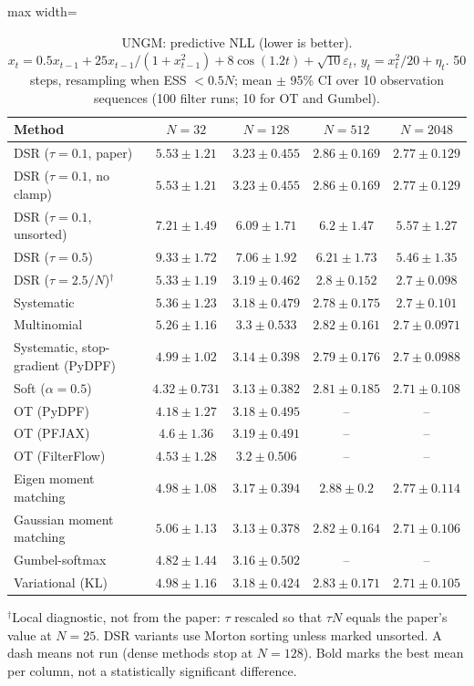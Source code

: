 \begin{table}[H]
\centering
\small
\caption{UNGM: predictive NLL (lower is better). $x_t=0.5x_{t-1}+25x_{t-1}/(1+x_{t-1}^2)+8\cos(1.2t)+\sqrt{10}\varepsilon_t$, $y_t=x_t^2/20+\eta_t$. 50 steps, resampling when ESS $<0.5N$; mean $\pm$ 95\% CI over 10 observation sequences (100 filter runs; 10 for OT and Gumbel).}
\label{tab:ungm-predictive_nll}
\begin{adjustbox}{max width=\linewidth}
\begin{tabular}{lcccc}
\toprule
Method & $N{=}32$ & $N{=}128$ & $N{=}512$ & $N{=}2048$ \\
\midrule
DSR ($\tau{=}0.1$, paper) & $5.53\pm1.21$ & $3.23\pm0.455$ & $2.86\pm0.169$ & $2.77\pm0.129$ \\
DSR ($\tau{=}0.1$, no clamp) & $5.53\pm1.21$ & $3.23\pm0.455$ & $2.86\pm0.169$ & $2.77\pm0.129$ \\
DSR ($\tau{=}0.1$, unsorted) & $7.21\pm1.49$ & $6.09\pm1.71$ & $6.2\pm1.47$ & $5.57\pm1.27$ \\
DSR ($\tau{=}0.5$) & $9.33\pm1.72$ & $7.06\pm1.92$ & $6.21\pm1.73$ & $5.46\pm1.35$ \\
DSR ($\tau{=}2.5/N$)$^\dagger$ & $5.33\pm1.19$ & $3.19\pm0.462$ & $2.8\pm0.152$ & $\mathbf{2.7\pm0.098}$ \\
\midrule
Systematic & $5.36\pm1.23$ & $3.18\pm0.479$ & $\mathbf{2.78\pm0.175}$ & $2.7\pm0.101$ \\
Multinomial & $5.26\pm1.16$ & $3.3\pm0.533$ & $2.82\pm0.161$ & $2.7\pm0.0971$ \\
Systematic, stop-gradient (PyDPF) & $4.99\pm1.02$ & $3.14\pm0.398$ & $2.79\pm0.176$ & $2.7\pm0.0988$ \\
Soft ($\alpha{=}0.5$) & $4.32\pm0.731$ & $3.13\pm0.382$ & $2.81\pm0.185$ & $2.71\pm0.108$ \\
OT (PyDPF) & $\mathbf{4.18\pm1.27}$ & $3.18\pm0.495$ & -- & -- \\
OT (PFJAX) & $4.6\pm1.36$ & $3.19\pm0.491$ & -- & -- \\
OT (FilterFlow) & $4.53\pm1.28$ & $3.2\pm0.506$ & -- & -- \\
Eigen moment matching & $4.98\pm1.08$ & $3.17\pm0.394$ & $2.88\pm0.2$ & $2.77\pm0.114$ \\
Gaussian moment matching & $5.06\pm1.13$ & $\mathbf{3.13\pm0.378}$ & $2.82\pm0.164$ & $2.71\pm0.106$ \\
Gumbel-softmax & $4.82\pm1.44$ & $3.16\pm0.502$ & -- & -- \\
Variational (KL) & $4.98\pm1.16$ & $3.18\pm0.424$ & $2.83\pm0.171$ & $2.71\pm0.105$ \\
\bottomrule
\end{tabular}
\end{adjustbox}
\par\smallskip\parbox{0.95\linewidth}{\footnotesize $^\dagger$Local diagnostic, not from the paper: $\tau$ rescaled so that $\tau N$ equals the paper's value at $N{=}25$. DSR variants use Morton sorting unless marked unsorted. A dash means not run (dense methods stop at $N{=}128$). Bold marks the best mean per column, not a statistically significant difference.}
\end{table}

